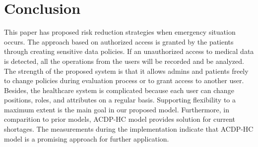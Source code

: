 \documentclass[conference]{IEEEtran}
\begin{document}

\section{Conclusion}\label{sec:conclusion}

This paper has proposed risk reduction strategies when emergency situation occurs. 
The approach based on authorized access is granted by the patients through creating sensitive data policies. 
If an unauthorized access to medical data is detected, all the operations from the users will be recorded and be analyzed.
The strength of the proposed system is that it allows admins and patients freely to change policies during evaluation process or to grant access to another user. 
Besides, the healthcare system is complicated because each user can change positions, roles, and attributes on a regular basis.
Supporting flexibility to a maximum extent is the main goal in our proposed model. 
Furthermore, in comparition to prior models, ACDP-HC model provides solution for current shortages. 
The measurements during the implementation indicate that ACDP-HC model is a promising approach for further application.
\end{document}
